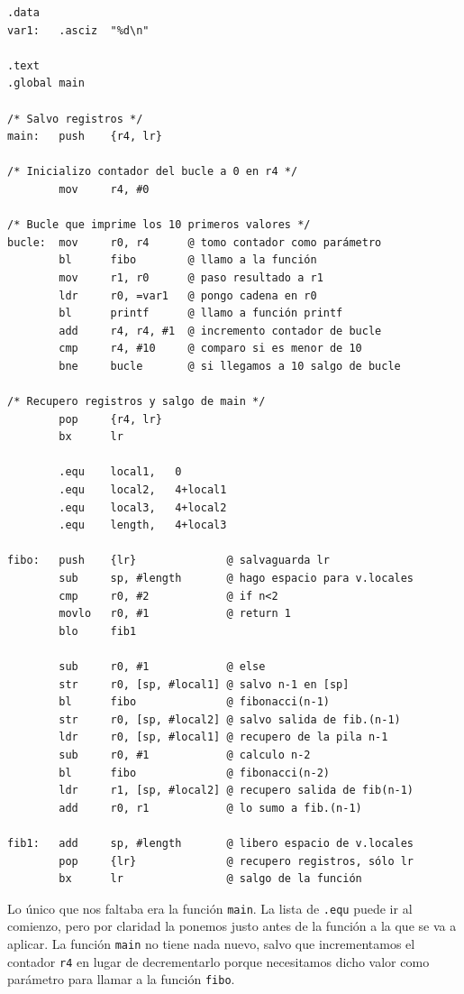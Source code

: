 \begin{lstlisting}[caption={Código del programa subrut3.s},label={lst:codigoPract3_5}]
.data
var1:   .asciz  "%d\n"

.text
.global main

/* Salvo registros */
main:   push    {r4, lr}

/* Inicializo contador del bucle a 0 en r4 */
        mov     r4, #0

/* Bucle que imprime los 10 primeros valores */
bucle:  mov     r0, r4      @ tomo contador como parámetro
        bl      fibo        @ llamo a la función
        mov     r1, r0      @ paso resultado a r1
        ldr     r0, =var1   @ pongo cadena en r0
        bl      printf      @ llamo a función printf
        add     r4, r4, #1  @ incremento contador de bucle
        cmp     r4, #10     @ comparo si es menor de 10
        bne     bucle       @ si llegamos a 10 salgo de bucle

/* Recupero registros y salgo de main */
        pop     {r4, lr}
        bx      lr

        .equ    local1,   0
        .equ    local2,   4+local1
        .equ    local3,   4+local2
        .equ    length,   4+local3

fibo:   push    {lr}              @ salvaguarda lr
        sub     sp, #length       @ hago espacio para v.locales
        cmp     r0, #2            @ if n<2
        movlo   r0, #1            @ return 1
        blo     fib1

        sub     r0, #1            @ else
        str     r0, [sp, #local1] @ salvo n-1 en [sp]
        bl      fibo              @ fibonacci(n-1)
        str     r0, [sp, #local2] @ salvo salida de fib.(n-1)
        ldr     r0, [sp, #local1] @ recupero de la pila n-1
        sub     r0, #1            @ calculo n-2
        bl      fibo              @ fibonacci(n-2)
        ldr     r1, [sp, #local2] @ recupero salida de fib(n-1)
        add     r0, r1            @ lo sumo a fib.(n-1)

fib1:   add     sp, #length       @ libero espacio de v.locales
        pop     {lr}              @ recupero registros, sólo lr
        bx      lr                @ salgo de la función
\end{lstlisting}

Lo único que nos faltaba era la función {\tt main}. La lista de {\tt .equ} puede
ir al comienzo, pero por claridad la ponemos justo antes de la función a la que
se va a aplicar. La función {\tt main} no tiene nada nuevo, salvo que incrementamos
el contador {\tt r4} en lugar de decrementarlo porque necesitamos dicho valor como
parámetro para llamar a la función {\tt fibo}.

